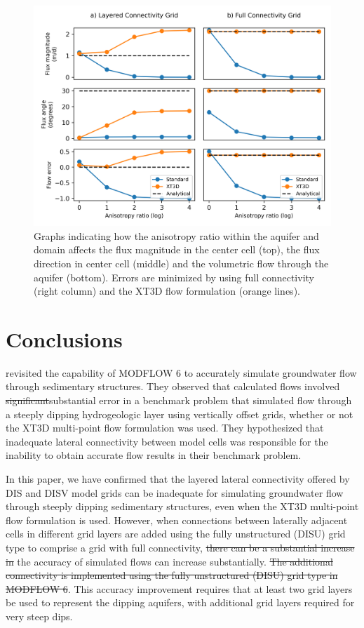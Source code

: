 \documentclass{article}
\begin{document}
\begin{figure}
	\begin{center}
	\includegraphics[scale=0.9]{../figures/fig5paper.png}
	\caption{Graphs indicating how the anisotropy ratio within the aquifer and domain affects the flux magnitude in the center cell (top), the flux direction in center cell (middle) and the volumetric flow through the aquifer (bottom). Errors are minimized by using full connectivity (right column) and the XT3D flow formulation (orange lines).}
	\label{fig:fig5}
	\end{center}
\end{figure}

\section*{Conclusions}

\cite{bardot2023} revisited the capability of MODFLOW 6 to accurately simulate groundwater flow through sedimentary structures. They observed that calculated flows involved {\color{red} \sout{significant}substantial} error in a benchmark problem that simulated flow through a steeply dipping hydrogeologic layer using vertically offset grids, whether or not the XT3D multi-point flow formulation was used. They hypothesized that inadequate lateral connectivity between model cells was responsible for the inability to obtain accurate flow results in their benchmark problem.

In this paper, we have confirmed that the layered lateral connectivity offered by DIS and DISV model grids can be inadequate for simulating groundwater flow through steeply dipping sedimentary structures, even when the XT3D multi-point flow formulation is used.  However, when connections between laterally adjacent cells in different grid layers are added {\color{red}using the fully unstructured (DISU) grid type} to comprise a grid with full connectivity, {\color{red} \sout{there can be a substantial increase in }}the accuracy of simulated flows {\color{red}can increase substantially.\sout{  The additional connectivity is implemented using the fully unstructured (DISU) grid type in MODFLOW 6}}. This accuracy improvement requires that at least two grid layers be used to represent the dipping aquifers, with additional grid layers required for very steep dips.
\end{document}
